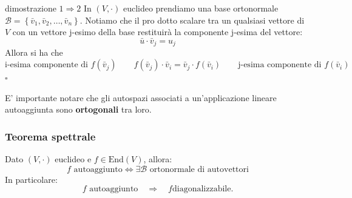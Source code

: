 \documentclass[x11names]{article}
\newcommand*{\QEDB}{\null\nobreak\hfill\ensuremath{\square}}%
\begin{document}
\begin{es}{dimostrazione $1 \Longrightarrow 2$}
	In $(V,\cdot)$ euclideo prendiamo una base ortonormale $\mathcal{B} = \left\{\bar{v}_{1},\bar{v}_{2},\dots,\bar{v}_{n}\right\}$. Notiamo che il pro dotto scalare tra un qualsiasi vettore di $V$ con un vettore j-esimo della base restituirà la componente j-esima del vettore:
	\[
	\bar{u} \cdot \bar{v}_{j} = u_{j}
	\]
	Allora si ha che
	\[
	\text{i-esima componente di } f(\bar{v}_{j}) \qquad f(\bar{v}_{j}) \cdot \bar{v}_{i} = \bar{v}_{j} \cdot f(\bar{v}_{i}) \qquad \text{j-esima componente di } f(\bar{v}_{i})
	\] \QEDB
\end{es}

\noindent
E' importante notare che gli autospazi associati a un'applicazione lineare autoaggiunta sono \textbf{ortogonali} tra loro.

\begin{center}
	\colorbox{myred}{\begin{minipage}{5.75in}
			\begin{redes}{}
				
			\subsubsection{Teorema spettrale}
			Dato $\left(V,\cdot\right)$ euclideo e $f \in \text{End}\left(V\right)$, allora: 
			\[
			f \text{ autoaggiunto} \Longleftrightarrow \exists \mathcal{B} \text{ ortonormale di autovettori}
			\]
			In particolare:
			\[
			f \text{ autoaggiunto}  \quad \Rightarrow \quad f \text{diagonalizzabile}
			.\] 	
			\end{redes}
	\end{minipage}}        
\end{center}
\end{document}

